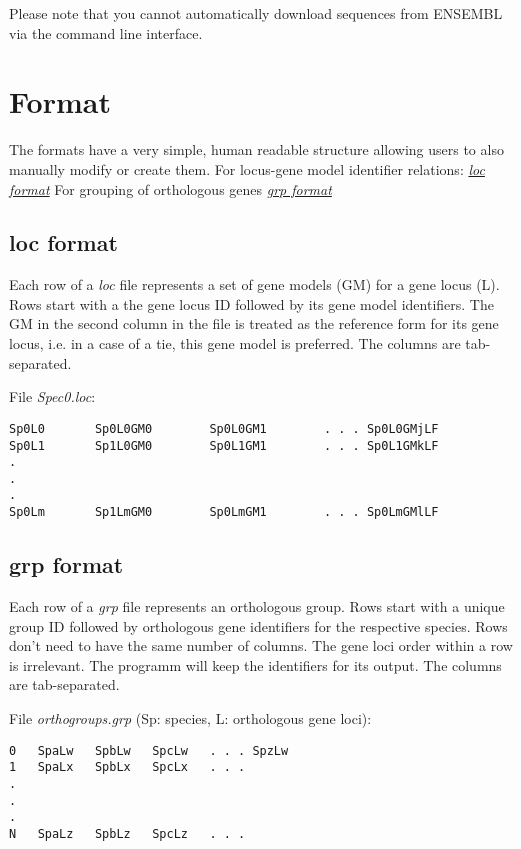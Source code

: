 \documentclass[letterpaper,10pt,english]{sphinxmanual}
\begin{document}
Please note that you cannot automatically download sequences from ENSEMBL via the command line interface.


\chapter{Format}
\label{Format:id1}\label{Format::doc}\label{Format:format}
The formats have a very simple, human readable structure allowing users to also manually modify or create them.
For locus-gene model identifier relations: {\hyperref[Format:loc-format]{\emph{loc format}}}
For grouping of orthologous genes {\hyperref[Format:grp-format]{\emph{grp format}}}


\section{loc format}
\label{Format:loc-format}\label{Format:id2}
Each row of a \emph{loc} file represents a set of gene models (GM) for a gene locus (L).
Rows start with a the gene locus ID followed by its gene model identifiers.
The GM in the second column in the file is treated as the reference form for its gene locus,
i.e. in a case of a tie, this gene model is preferred.
The columns are tab-separated.

File \emph{Spec0.loc}:

\begin{Verbatim}[commandchars=\\\{\}]
Sp0L0       Sp0L0GM0        Sp0L0GM1        . . . Sp0L0GMjLF
Sp0L1       Sp1L0GM0        Sp0L1GM1        . . . Sp0L1GMkLF
.
.
.
Sp0Lm       Sp1LmGM0        Sp0LmGM1        . . . Sp0LmGMlLF
\end{Verbatim}


\section{grp format}
\label{Format:grp-format}\label{Format:id3}
Each row of a \emph{grp} file represents an orthologous group.
Rows start with a unique group ID followed by orthologous gene identifiers for the respective species.
Rows don't need to have the same number of columns. The gene loci order within a row is irrelevant.
The programm will keep the identifiers for its output.
The columns are tab-separated.

File \emph{orthogroups.grp} (Sp: species, L: orthologous gene loci):

\begin{Verbatim}[commandchars=\\\{\}]
0   SpaLw   SpbLw   SpcLw   . . . SpzLw
1   SpaLx   SpbLx   SpcLx   . . .
.
.
.
N   SpaLz   SpbLz   SpcLz   . . .
\end{Verbatim}
\end{document}
